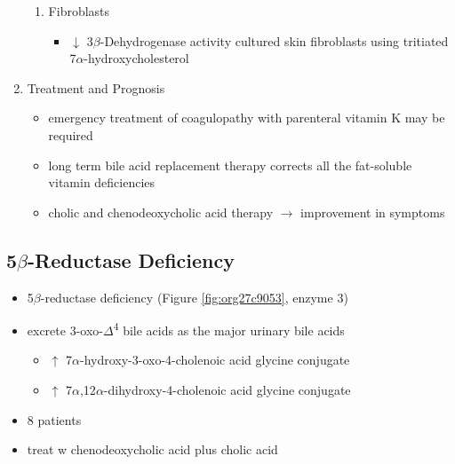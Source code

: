 \documentclass[12pt]{scrartcl}
\begin{document}
\begin{enumerate}
\begin{enumerate}
\item Fibroblasts
\label{sec:org7720cc5}
\begin{itemize}
\item \(\downarrow\) 3\(\beta\)-Dehydrogenase activity cultured skin fibroblasts using
tritiated 7\(\alpha\)-hydroxycholesterol
\end{itemize}
\end{enumerate}

\item Treatment and Prognosis
\label{sec:org431dc5e}
\begin{itemize}
\item emergency treatment of coagulopathy with parenteral vitamin K may be required
\item long term bile acid replacement therapy corrects all the fat-soluble
vitamin deficiencies

\item cholic and chenodeoxycholic acid therapy \(\to\) improvement in symptoms
\end{itemize}
\end{enumerate}

\subsection{5\(\beta\)-Reductase Deficiency}
\label{sec:org4bb8bb5}
\begin{itemize}
\item 5\(\beta\)-reductase deficiency (Figure \ref{fig:org27c9053}, enzyme 3)
\item excrete 3-oxo-\(\Delta\)\textsuperscript{4} bile acids as the major urinary bile acids
\begin{itemize}
\item \(\uparrow\) 7\(\alpha\)-hydroxy-3-oxo-4-cholenoic acid glycine conjugate
\item \(\uparrow\) 7\(\alpha\),12\(\alpha\)-dihydroxy-4-cholenoic acid glycine conjugate
\end{itemize}
\item 8 patients
\item treat w chenodeoxycholic acid plus cholic acid
\end{itemize}
\end{document}
